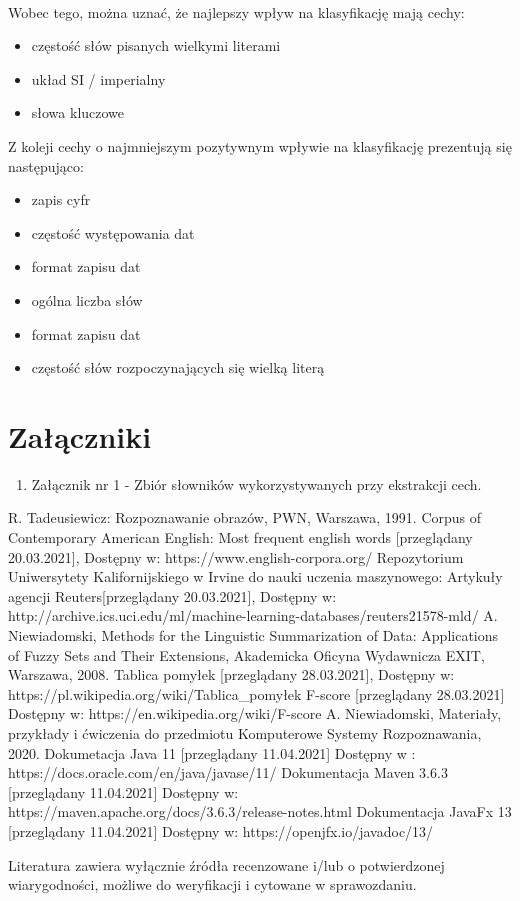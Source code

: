 \documentclass{classrep}
\begin{document}
\\ Wobec tego, można uznać, że najlepszy wpływ na klasyfikację mają cechy: 
\begin{itemize}
    \item częstość słów pisanych wielkymi literami
    \item układ SI / imperialny
    \item słowa kluczowe
\end{itemize}
Z koleji cechy o najmniejszym pozytywnym wpływie na klasyfikację prezentują się następująco:
\begin{itemize}
    \item zapis cyfr
    \item częstość występowania dat
    \item format zapisu dat
    \item ogólna liczba słów
    \item format zapisu dat
    \item częstość słów rozpoczynających się wielką literą
\end{itemize}


\section*{Załączniki}
\begin{enumerate}
   \item Załącznik nr 1 - Zbiór słowników wykorzystywanych przy ekstrakcji cech.
\end{enumerate}

\begin{thebibliography}{0}
 R. Tadeusiewicz: Rozpoznawanie obrazów, PWN, Warszawa, 1991.  
 Corpus of Contemporary American English: Most frequent english words [przeglądany  20.03.2021], Dostępny w: https://www.english-corpora.org/
 Repozytorium Uniwersytety Kalifornijskiego w Irvine do nauki uczenia maszynowego: Artykuły agencji Reuters[przeglądany 20.03.2021], 
Dostępny w: http://archive.ics.uci.edu/ml/machine-learning-databases/reuters21578-mld/
 A. Niewiadomski, Methods for the Linguistic Summarization of Data: Applications of Fuzzy Sets and Their Extensions, Akademicka Oficyna Wydawnicza EXIT, Warszawa, 2008.
 Tablica pomyłek [przeglądany 28.03.2021], Dostępny w: https://pl.wikipedia.org/wiki/Tablica\_pomyłek
 F-score [przeglądany 28.03.2021] Dostępny w: https://en.wikipedia.org/wiki/F-score
 A. Niewiadomski, Materiały, przykłady i ćwiczenia do przedmiotu Komputerowe Systemy Rozpoznawania, 2020.
 Dokumetacja Java 11 [przeglądany 11.04.2021] Dostępny w : https://docs.oracle.com/en/java/javase/11/
 Dokumentacja Maven 3.6.3 [przeglądany 11.04.2021] Dostępny w: https://maven.apache.org/docs/3.6.3/release-notes.html
 Dokumentacja JavaFx 13 [przeglądany 11.04.2021] Dostępny w: https://openjfx.io/javadoc/13/ 
\end{thebibliography}

Literatura zawiera wyłącznie źródła recenzowane i/lub o potwierdzonej wiarygodności,
możliwe do weryfikacji i cytowane w sprawozdaniu. 
\end{document}
